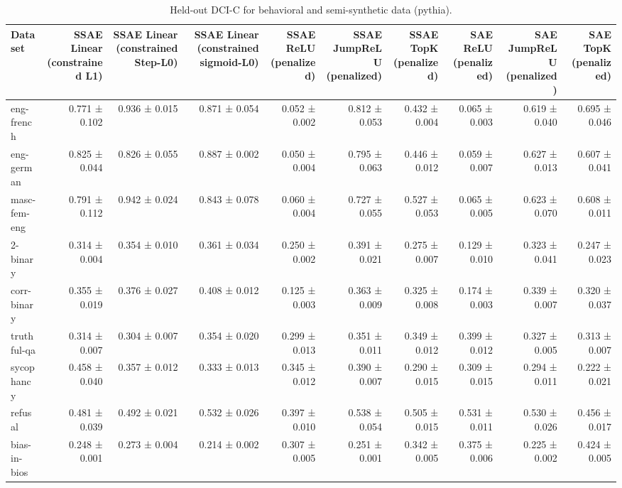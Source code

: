 \begin{table}[t]
\centering
\caption{Held-out DCI-C for behavioral and semi-synthetic data (pythia).}
\label{tab:all-datasets-pythia-dci-c}
\begin{tabular}{lrrrrrrrrr}
\toprule
Dataset & SSAE Linear (constrained L1) & SSAE Linear (constrained Step-L0) & SSAE Linear (constrained sigmoid-L0) & SSAE ReLU (penalized) & SSAE JumpReLU (penalized) & SSAE TopK (penalized) & SAE ReLU (penalized) & SAE JumpReLU (penalized) & SAE TopK (penalized) \\
\midrule
eng-french & 0.771 ± 0.102 & 0.936 ± 0.015 & 0.871 ± 0.054 & 0.052 ± 0.002 & 0.812 ± 0.053 & 0.432 ± 0.004 & 0.065 ± 0.003 & 0.619 ± 0.040 & 0.695 ± 0.046 \\
eng-german & 0.825 ± 0.044 & 0.826 ± 0.055 & 0.887 ± 0.002 & 0.050 ± 0.004 & 0.795 ± 0.063 & 0.446 ± 0.012 & 0.059 ± 0.007 & 0.627 ± 0.013 & 0.607 ± 0.041 \\
masc-fem-eng & 0.791 ± 0.112 & 0.942 ± 0.024 & 0.843 ± 0.078 & 0.060 ± 0.004 & 0.727 ± 0.055 & 0.527 ± 0.053 & 0.065 ± 0.005 & 0.623 ± 0.070 & 0.608 ± 0.011 \\
2-binary & 0.314 ± 0.004 & 0.354 ± 0.010 & 0.361 ± 0.034 & 0.250 ± 0.002 & 0.391 ± 0.021 & 0.275 ± 0.007 & 0.129 ± 0.010 & 0.323 ± 0.041 & 0.247 ± 0.023 \\
corr-binary & 0.355 ± 0.019 & 0.376 ± 0.027 & 0.408 ± 0.012 & 0.125 ± 0.003 & 0.363 ± 0.009 & 0.325 ± 0.008 & 0.174 ± 0.003 & 0.339 ± 0.007 & 0.320 ± 0.037 \\
truthful-qa & 0.314 ± 0.007 & 0.304 ± 0.007 & 0.354 ± 0.020 & 0.299 ± 0.013 & 0.351 ± 0.011 & 0.349 ± 0.012 & 0.399 ± 0.012 & 0.327 ± 0.005 & 0.313 ± 0.007 \\
sycophancy & 0.458 ± 0.040 & 0.357 ± 0.012 & 0.333 ± 0.013 & 0.345 ± 0.012 & 0.390 ± 0.007 & 0.290 ± 0.015 & 0.309 ± 0.015 & 0.294 ± 0.011 & 0.222 ± 0.021 \\
refusal & 0.481 ± 0.039 & 0.492 ± 0.021 & 0.532 ± 0.026 & 0.397 ± 0.010 & 0.538 ± 0.054 & 0.505 ± 0.015 & 0.531 ± 0.011 & 0.530 ± 0.026 & 0.456 ± 0.017 \\
bias-in-bios & 0.248 ± 0.001 & 0.273 ± 0.004 & 0.214 ± 0.002 & 0.307 ± 0.005 & 0.251 ± 0.001 & 0.342 ± 0.005 & 0.375 ± 0.006 & 0.225 ± 0.002 & 0.424 ± 0.005 \\
\bottomrule
\end{tabular}
\end{table}
